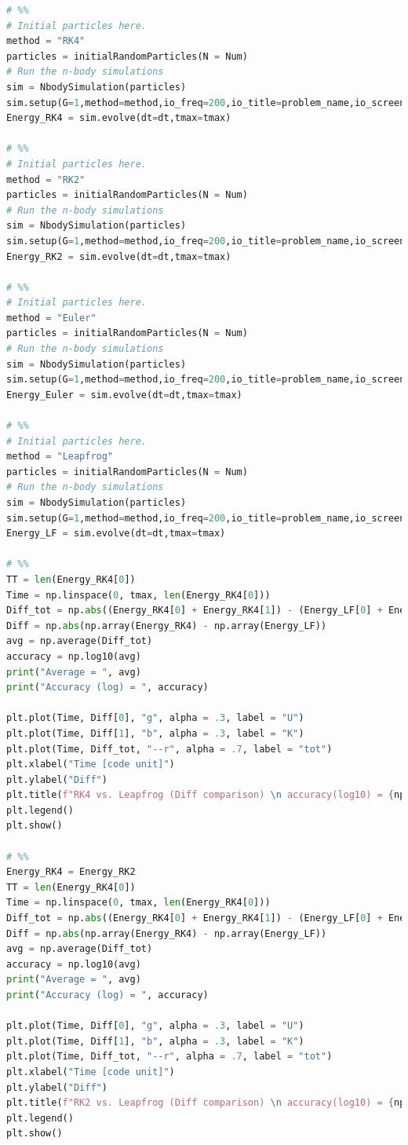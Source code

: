 \documentclass[12pt]{article}
\begin{document}
\begin{lstlisting}[language={Python}]
# %%
# Initial particles here.
method = "RK4"
particles = initialRandomParticles(N = Num)
# Run the n-body simulations
sim = NbodySimulation(particles)
sim.setup(G=1,method=method,io_freq=200,io_title=problem_name,io_screen=True,visualized=False)
Energy_RK4 = sim.evolve(dt=dt,tmax=tmax)

# %%
# Initial particles here.
method = "RK2"
particles = initialRandomParticles(N = Num)
# Run the n-body simulations
sim = NbodySimulation(particles)
sim.setup(G=1,method=method,io_freq=200,io_title=problem_name,io_screen=True,visualized=False)
Energy_RK2 = sim.evolve(dt=dt,tmax=tmax)

# %%
# Initial particles here.
method = "Euler"
particles = initialRandomParticles(N = Num)
# Run the n-body simulations
sim = NbodySimulation(particles)
sim.setup(G=1,method=method,io_freq=200,io_title=problem_name,io_screen=True,visualized=False)
Energy_Euler = sim.evolve(dt=dt,tmax=tmax)

# %%
# Initial particles here.
method = "Leapfrog"
particles = initialRandomParticles(N = Num)
# Run the n-body simulations
sim = NbodySimulation(particles)
sim.setup(G=1,method=method,io_freq=200,io_title=problem_name,io_screen=True,visualized=False)
Energy_LF = sim.evolve(dt=dt,tmax=tmax)

# %%
TT = len(Energy_RK4[0])
Time = np.linspace(0, tmax, len(Energy_RK4[0]))
Diff_tot = np.abs((Energy_RK4[0] + Energy_RK4[1]) - (Energy_LF[0] + Energy_LF[1]))
Diff = np.abs(np.array(Energy_RK4) - np.array(Energy_LF))
avg = np.average(Diff_tot)
accuracy = np.log10(avg)
print("Average = ", avg)
print("Accuracy (log) = ", accuracy)

plt.plot(Time, Diff[0], "g", alpha = .3, label = "U")
plt.plot(Time, Diff[1], "b", alpha = .3, label = "K")
plt.plot(Time, Diff_tot, "--r", alpha = .7, label = "tot")
plt.xlabel("Time [code unit]")
plt.ylabel("Diff")
plt.title(f"RK4 vs. Leapfrog (Diff comparison) \n accuracy(log10) = {np.round(accuracy, 5)}")
plt.legend()
plt.show()

# %%
Energy_RK4 = Energy_RK2
TT = len(Energy_RK4[0])
Time = np.linspace(0, tmax, len(Energy_RK4[0]))
Diff_tot = np.abs((Energy_RK4[0] + Energy_RK4[1]) - (Energy_LF[0] + Energy_LF[1]))
Diff = np.abs(np.array(Energy_RK4) - np.array(Energy_LF))
avg = np.average(Diff_tot)
accuracy = np.log10(avg)
print("Average = ", avg)
print("Accuracy (log) = ", accuracy)

plt.plot(Time, Diff[0], "g", alpha = .3, label = "U")
plt.plot(Time, Diff[1], "b", alpha = .3, label = "K")
plt.plot(Time, Diff_tot, "--r", alpha = .7, label = "tot")
plt.xlabel("Time [code unit]")
plt.ylabel("Diff")
plt.title(f"RK2 vs. Leapfrog (Diff comparison) \n accuracy(log10) = {np.round(accuracy, 5)}")
plt.legend()
plt.show()


\end{lstlisting}
\end{document}
